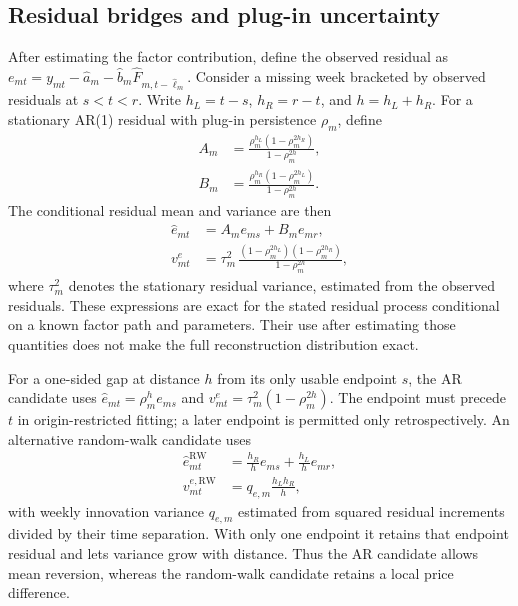 \documentclass[sigconf,nonacm,balance=false]{acmart}
\begin{document}
\subsection{Residual bridges and plug-in uncertainty}

After estimating the factor contribution, define the observed residual as $e_{mt}=y_{mt}-\hat a_m-\hat b_m\hat F_{m,t-\hat\ell_m}$. Consider a missing week bracketed by observed residuals at $s<t<r$. Write $h_L=t-s$, $h_R=r-t$, and $h=h_L+h_R$. For a stationary AR(1) residual with plug-in persistence $\rho_m$, define
\begin{equation}\label{eq:bridgeweights}
\begin{aligned}
A_m &= \frac{\rho_m^{h_L}(1-\rho_m^{2h_R})}{1-\rho_m^{2h}},\\[2pt]
B_m &= \frac{\rho_m^{h_R}(1-\rho_m^{2h_L})}{1-\rho_m^{2h}}.
\end{aligned}
\end{equation}
The conditional residual mean and variance are then
\begin{align}
\hat e_{mt} &= A_m e_{ms}+B_m e_{mr}, \label{eq:bridge}\\
v^e_{mt} &= \tau_m^2\,
\frac{(1-\rho_m^{2h_L})(1-\rho_m^{2h_R})}
     {1-\rho_m^{2h}}, \label{eq:bridgevar}
\end{align}
where $\tau_m^2$ denotes the stationary residual variance, estimated from the observed residuals. These expressions are exact for the stated residual process conditional on a known factor path and parameters. Their use after estimating those quantities does not make the full reconstruction distribution exact.

For a one-sided gap at distance $h$ from its only usable endpoint $s$, the AR candidate uses $\hat e_{mt}=\rho_m^h e_{ms}$ and $v^e_{mt}=\tau_m^2(1-\rho_m^{2h})$. The endpoint must precede $t$ in origin-restricted fitting; a later endpoint is permitted only retrospectively. An alternative random-walk candidate uses
\begin{align}
\hat e^{\mathrm{RW}}_{mt}
&=\frac{h_R}{h}e_{ms}+\frac{h_L}{h}e_{mr},\\
v^{e,\mathrm{RW}}_{mt}&=q_{e,m}\frac{h_Lh_R}{h},
\end{align}
with weekly innovation variance $q_{e,m}$ estimated from squared residual increments divided by their time separation. With only one endpoint it retains that endpoint residual and lets variance grow with distance. Thus the AR candidate allows mean reversion, whereas the random-walk candidate retains a local price difference.
\end{document}
